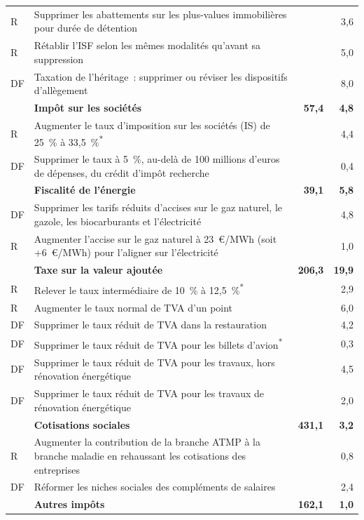 \begin{center}
\begin{minipage}{\textwidth}
\begin{tabularx}{\textwidth}{@{}l>{\raggedright\arraybackslash}Xrr@{}}
    R & Supprimer les abattements sur les plus-values immobilières pour durée de détention & & 3,6 \\
    R & Rétablir l'ISF selon les mêmes modalités qu'avant sa suppression & & 5,0 \\
    DF & Taxation de l'héritage~: supprimer ou réviser les dispositifs d'allègement & & 8,0 \\
    \midrule
    & \textbf{Impôt sur les sociétés} & \textbf{57,4} & \textbf{4,8} \\
    R & Augmenter le taux d'imposition sur les sociétés (IS) de 25~\% à 33,5~\%\textsuperscript{*} & & 4,4 \\
    DF & Supprimer le taux à 5~\%, au-delà de 100 millions d'euros de dépenses, du crédit d'impôt recherche & & 0,4 \\
    \midrule
    & \textbf{Fiscalité de l'énergie} & \textbf{39,1} & \textbf{5,8} \\
    DF & Supprimer les tarifs réduits d'accises sur le gaz naturel, le gazole, les biocarburants et l'électricité & & 4,8 \\
    R & Augmenter l'accise sur le gaz naturel à 23~€/MWh (soit +6~€/MWh) pour l'aligner sur l'électricité & & 1,0 \\
    \midrule
    & \textbf{Taxe sur la valeur ajoutée} & \textbf{206,3} & \textbf{19,9} \\
    R & Relever le taux intermédiaire de 10~\% à 12,5~\%\textsuperscript{*} & & 2,9 \\
    R & Augmenter le taux normal de TVA d'un point & & 6,0 \\
    DF & Supprimer le taux réduit de TVA dans la restauration & & 4,2 \\
    DF & Supprimer le taux réduit de TVA pour les billets d'avion\textsuperscript{*} & & 0,3 \\
    DF & Supprimer le taux réduit de TVA pour les travaux, hors rénovation énergétique & & 4,5 \\
    DF & Supprimer le taux réduit de TVA pour les travaux de rénovation énergétique & & 2,0 \\
    \midrule
    & \textbf{Cotisations sociales} & \textbf{431,1} & \textbf{3,2} \\
    R & Augmenter la contribution de la branche ATMP à la branche maladie en rehaussant les cotisations des entreprises & & 0,8 \\
    DF & Réformer les niches sociales des compléments de salaires & & 2,4 \\
    \midrule
    & \textbf{Autres impôts} & \textbf{162,1} & \textbf{1,0} \\

\end{tabularx}
\end{minipage}
\end{center}
